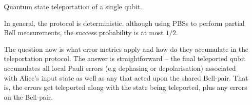 \begin{table}[!htb]
\caption{Quantum state teleportation of a single qubit.} \label{alg:state_teleport}
\end{table}

In general, the protocol is deterministic, although using PBSs to perform partial Bell measurements, the success probability is at most $1/2$.

The question now is what error metrics apply and how do they accumulate in the teleportation protocol. The answer is straightforward -- the final teleported qubit accumulates all local Pauli errors (e.g dephasing or depolarisation) associated with Alice's input state as well as any that acted upon the shared Bell-pair. That is, the errors get teleported along with the state being teleported, plus any errors on the Bell-pair.

